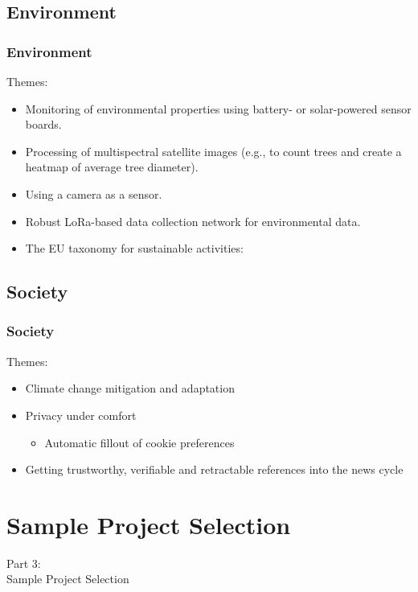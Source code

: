 \subsection{Environment}
\begin{frame}
    \frametitle{Environment}
    \vspace{3mm}
    Themes:
    \begin{itemize}
        \item Monitoring of environmental properties using battery- or solar-powered sensor boards.
        \item Processing of multispectral satellite images (e.g., to count trees and create a heatmap of average tree diameter).
        \item Using a camera as a sensor.
        \item Robust LoRa-based data collection network for environmental data.
        \item The EU taxonomy for sustainable activities:
          \\
    \end{itemize}
\end{frame}

\subsection{Society}
\begin{frame}
    \frametitle{Society}
    \vspace{3mm}
    Themes:
    \begin{itemize}
        \item Climate change mitigation and adaptation
        \item Privacy under comfort
          \begin{itemize}
            \item Automatic fillout of cookie preferences
          \end{itemize}
        \item Getting trustworthy, verifiable and retractable references into the news cycle
    \end{itemize}
\end{frame}

\section{Sample Project Selection}
\begin{frame}
    \vspace{25mm}
    \begin{center}
        \Huge{Part 3:\\Sample Project Selection}
    \end{center}
\end{frame}

